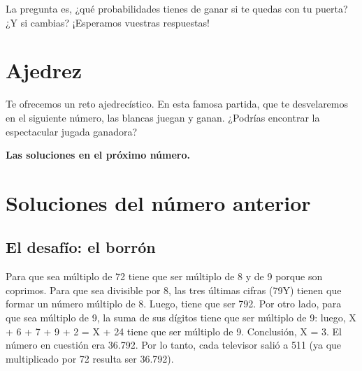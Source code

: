\begin{multicols}{2}
La pregunta es, ¿qué probabilidades tienes de ganar si te quedas con tu puerta? ¿Y si cambias? ¡Esperamos vuestras respuestas!


\section{Ajedrez}

Te ofrecemos un reto ajedrecístico. En esta famosa partida, que te desvelaremos en el siguiente número, las blancas juegan y ganan. ¿Podrías encontrar la espectacular jugada ganadora?

\newgame
{}
\begin{center}
\showboard 
\end{center}

{\bf Las soluciones en el próximo número.}
\section*{\textcolor{redsol}{Soluciones del número anterior}}
\subsection*{El desafío: el borrón}
Para que sea múltiplo de 72 tiene que ser múltiplo de 8 y de 9
porque son coprimos. Para que sea divisible por 8, las tres últimas
cifras (79Y) tienen que formar un número múltiplo de 8. Luego,
tiene que ser 792. Por otro lado, para que sea múltiplo de 9, la
suma de sus dígitos tiene que ser múltiplo de 9: luego, X + 6 + 7
+ 9 + 2 = X + 24 tiene que ser múltiplo de 9. Conclusión, X = 3. El
número en cuestión era 36.792. Por lo tanto, cada televisor salió
a  511 (ya que multiplicado por 72 resulta ser 36.792).
\end{multicols}

